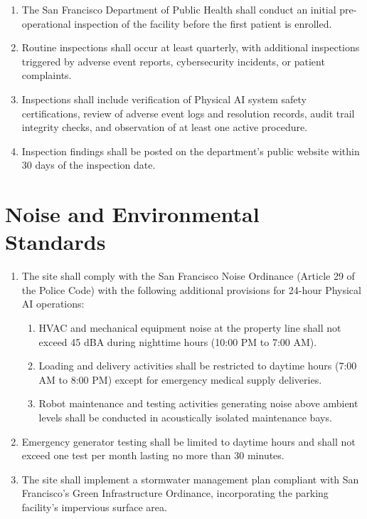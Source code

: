 \begin{enumerate}[label=(\alph*)]
\item The San Francisco Department of Public Health shall conduct an initial
  pre-operational inspection of the facility before the first patient is
  enrolled.

\item Routine inspections shall occur at least quarterly, with additional
  inspections triggered by adverse event reports, cybersecurity incidents, or
  patient complaints.

\item Inspections shall include verification of Physical AI system safety
  certifications, review of adverse event logs and resolution records, audit
  trail integrity checks, and observation of at least one active procedure.

\item Inspection findings shall be posted on the department's public website
  within 30 days of the inspection date.
\end{enumerate}

\section{Noise and Environmental Standards}

\begin{enumerate}[label=(\alph*)]
\item The site shall comply with the San Francisco Noise Ordinance (Article 29
  of the Police Code) with the following additional provisions for 24-hour
  Physical AI operations:
  \begin{enumerate}[label=(\arabic*)]
  \item HVAC and mechanical equipment noise at the property line shall not
    exceed 45 dBA during nighttime hours (10:00 PM to 7:00 AM).
  \item Loading and delivery activities shall be restricted to daytime hours
    (7:00 AM to 8:00 PM) except for emergency medical supply deliveries.
  \item Robot maintenance and testing activities generating noise above ambient
    levels shall be conducted in acoustically isolated maintenance bays.
  \end{enumerate}

\item Emergency generator testing shall be limited to daytime hours and shall
  not exceed one test per month lasting no more than 30 minutes.

\item The site shall implement a stormwater management plan compliant with San
  Francisco's Green Infrastructure Ordinance, incorporating the parking
  facility's impervious surface area.
\end{enumerate}

